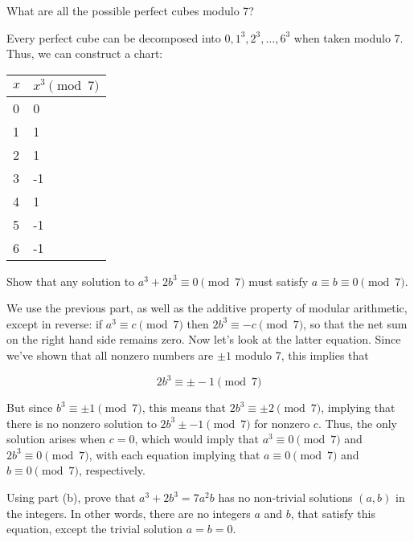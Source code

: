 \documentclass[11pt]{article}
\begin{document}
\begin{Parts}

\Part What are all the possible perfect cubes modulo 7?

\begin{solution}
  Every perfect cube can be decomposed into $0, 1^3, 2^3, \dots, 6^3$ when taken modulo 7. Thus, we can construct a chart: 

  \begin{center}
    \begin{tabular}{l|l}
      $x$ & $x^3 \pmod{7}$ \\ \hline
      0   & 0              \\
      1   & 1              \\
      2   & 1              \\
      3   & -1             \\
      4   & 1              \\
      5   & -1             \\
      6   & -1            
      \end{tabular}
  \end{center}


\end{solution}
\Part Show that any solution to $a^3 + 2b^3 \equiv 0 \pmod{7}$ must satisfy $a \equiv b \equiv 0 \pmod{7}$.


\begin{solution}
  We use the previous part, as well as the additive property of modular arithmetic, except in reverse: if $a^3 \equiv c \pmod 7$ then $2b^3 \equiv -c \pmod 7$, so that the net sum on the right hand side remains zero. Now let's look at the latter equation. Since we've shown that all nonzero numbers are $\pm 1$ modulo 7, this implies that

  \[ 2b^3 \equiv \pm -1 \pmod 7\] 

  But since $b^3 \equiv \pm 1 \pmod 7$, this means that $2b^3 \equiv \pm 2 \pmod 7$, implying that there is no nonzero solution to $2b^3 \pm -1 \pmod 7$ for nonzero $c$. Thus, the only solution arises when $c = 0$, which would imply that $a^3 \equiv 0 \pmod 7$ and $2b^3 \equiv 0 \pmod 7$, with each equation implying that $a \equiv 0 \pmod 7$ and $b \equiv 0 \pmod 7$, respectively.
\end{solution}

\Part Using part (b), prove that $a^3 + 2b^3 = 7a^2b$ has no non-trivial solutions $(a, b)$ in the integers. In other words, there are no integers $a$ and $b$, that satisfy this equation, except the trivial solution $a=b=0$.


\end{Parts}
\end{document}
